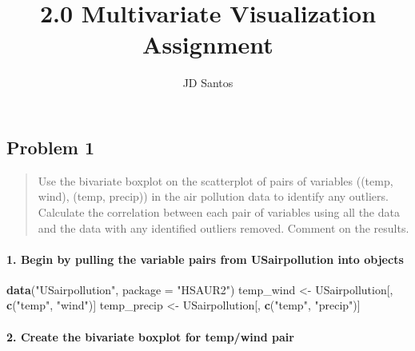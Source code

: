 \documentclass[
]{article}
\title{2.0 Multivariate Visualization Assignment}
\author{JD Santos}
\date{}
\newenvironment{Shaded}{\begin{snugshade}}{\end{snugshade}}
\newcommand{\DataTypeTok}[1]{\textcolor[rgb]{0.13,0.29,0.53}{#1}}
\newcommand{\KeywordTok}[1]{\textcolor[rgb]{0.13,0.29,0.53}{\textbf{#1}}}
\newcommand{\NormalTok}[1]{#1}
\newcommand{\StringTok}[1]{\textcolor[rgb]{0.31,0.60,0.02}{#1}}
\begin{document}
\maketitle

\hypertarget{problem-1}{%
\subsection{Problem 1}\label{problem-1}}

\begin{quote}
Use the bivariate boxplot on the scatterplot of pairs of variables
((temp, wind), (temp, precip)) in the air pollution data to identify any
outliers. Calculate the correlation between each pair of variables using
all the data and the data with any identified outliers removed. Comment
on the results.
\end{quote}

\hypertarget{begin-by-pulling-the-variable-pairs-from-usairpollution-into-objects}{%
\paragraph{\texorpdfstring{\textbf{1. Begin by pulling the variable
pairs from USairpollution into
objects}}{1. Begin by pulling the variable pairs from USairpollution into objects}}\label{begin-by-pulling-the-variable-pairs-from-usairpollution-into-objects}}

\begin{Shaded}
\begin{Highlighting}[]
\KeywordTok{data}\NormalTok{(}\StringTok{"USairpollution"}\NormalTok{, }\DataTypeTok{package =} \StringTok{"HSAUR2"}\NormalTok{) }
\NormalTok{temp_wind <-}\StringTok{ }\NormalTok{USairpollution[, }\KeywordTok{c}\NormalTok{(}\StringTok{"temp"}\NormalTok{, }\StringTok{"wind"}\NormalTok{)] }
\NormalTok{temp_precip <-}\StringTok{ }\NormalTok{USairpollution[, }\KeywordTok{c}\NormalTok{(}\StringTok{"temp"}\NormalTok{, }\StringTok{"precip"}\NormalTok{)]}
\end{Highlighting}
\end{Shaded}

\hypertarget{create-the-bivariate-boxplot-for-tempwind-pair}{%
\paragraph{\texorpdfstring{\textbf{2. Create the bivariate boxplot for
temp/wind
pair}}{2. Create the bivariate boxplot for temp/wind pair}}\label{create-the-bivariate-boxplot-for-tempwind-pair}}
\end{document}
